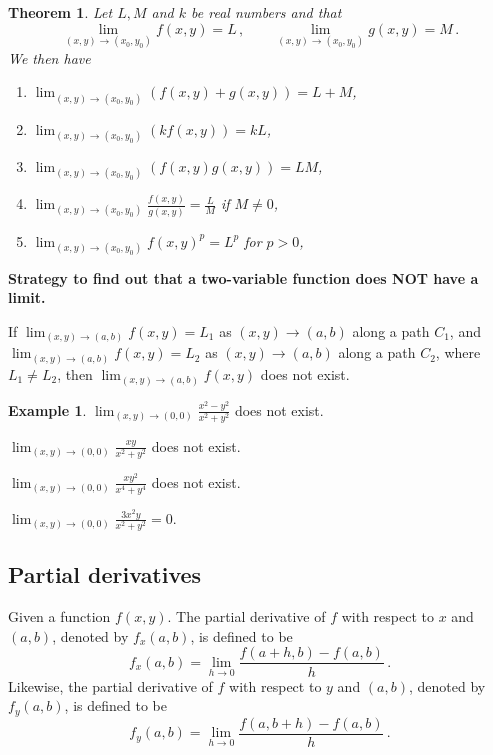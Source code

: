 \documentclass[
]{article}
\newtheorem{theorem}{Theorem}[section]
\theoremstyle{definition}
\theoremstyle{definition}
\newtheorem{example}{Example}[section]
\theoremstyle{definition}
\theoremstyle{definition}
\theoremstyle{remark}
\begin{document}
\begin{theorem}

Let \(L,M\) and \(k\) be real numbers and that
\begin{equation*}
    \lim_{(x,y) \to (x_0,y_0)} f(x,y) = L \,, \qquad 
    \lim_{(x,y) \to (x_0,y_0)} g(x,y) = M \,.
\end{equation*}
We then have

\begin{enumerate}
\def\labelenumi{\arabic{enumi}.}
\item
  \(\displaystyle \lim_{(x,y) \to (x_0,y_0)} (f(x,y) + g(x,y)) = L + M\),
\item
  \(\displaystyle \lim_{(x,y) \to (x_0,y_0)} (k f(x,y)) = kL\),
\item
  \(\displaystyle \lim_{(x,y) \to (x_0,y_0)} (f(x,y) g(x,y)) = LM\),
\item
  \(\displaystyle \lim_{(x,y) \to (x_0,y_0)} \frac{f(x,y)}{g(x,y)} = \frac{L}{M}\) if \(M \not= 0\),
\item
  \(\displaystyle \lim_{(x,y) \to (x_0,y_0)} {f(x,y)^p} = L^p\) for \(p>0\),
\end{enumerate}

\end{theorem}

\textbf{Strategy to find out that a two-variable function does NOT have a limit.}

If \(\lim_{(x,y) \to (a,b)} f(x,y) = L_1\) as \((x,y) \to (a,b)\) along a path \(C_1\),
and \(\lim_{(x,y) \to (a,b)} f(x,y) = L_2\) as \((x,y) \to (a,b)\) along a path \(C_2\),
where \(L_1 \neq L_2\), then \(\lim_{(x,y) \to (a,b)} f(x,y)\) does not exist.

\begin{example}
\(\lim_{(x,y)\to (0,0)} \frac{x^2 - y^2}{x^2 + y^2}\) does not exist.

\(\lim_{(x,y)\to (0,0)} \frac{xy}{x^2 + y^2}\) does not exist.

\(\lim_{(x,y)\to (0,0)} \frac{xy^2}{x^4 + y^4}\) does not exist.

\(\lim_{(x,y)\to (0,0)} \frac{3x^2y}{x^2 + y^2} = 0\).
\end{example}

\hypertarget{partial-derivatives-1}{%
\subsection{Partial derivatives}\label{partial-derivatives-1}}

Given a function \(f(x,y)\). The partial derivative of \(f\) with respect to \(x\) and \((a,b)\),
denoted by \(f_x(a,b)\), is defined to be
\begin{equation*}
    f_x(a,b) = \lim_{h\to 0} \frac{ f(a+h,b) - f(a,b)}{h} \,.
\end{equation*}
Likewise, the partial derivative of \(f\) with respect to \(y\) and \((a,b)\),
denoted by \(f_y(a,b)\), is defined to be
\begin{equation*}
    f_y(a,b) = \lim_{h\to 0} \frac{ f(a,b+h) - f(a,b)}{h} \,.
\end{equation*}
\end{document}

